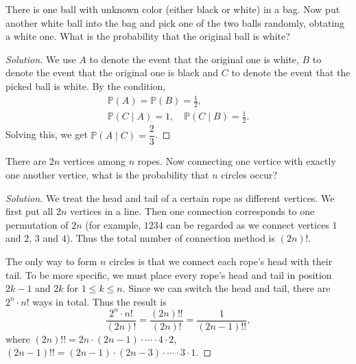 \documentclass[11pt,singlecolumn, openany, citestyle=authoryear]{elegantbook}
\begin{document}
\begin{CJK}{UTF8}{gbsn}
\begin{exercise}
    There is one ball with unknown color (either black or white) in a bag. 
    Now put another white ball into the bag and pick one of the two balls randomly,
    obtating a white one. What is the probability that the original ball is white? 
\end{exercise}
\begin{proof}[Solution]
    We use $A$ to denote the event that the original one is white, $B$ to denote the 
    event that the original one is black and $C$ to denote the event that the picked 
    ball is white. By the condition,
    \begin{gather*}
        \mathbb{P}(A) = \mathbb{P}(B) = \frac{1}{2},\\
        \mathbb{P}(C\mid A) = 1, \quad 
        \mathbb{P}(C \mid B) = \frac{1}{2}.
    \end{gather*} 
    Solving this, we get $\mathbb{P}(A\mid C)=\dfrac{2}{3}$.
\end{proof}

\begin{exercise}
    There are $2n$ vertices among $n$ ropes. Now connecting one vertice with exactly one 
    another vertice, what is the probability that $n$ circles occur? 
\end{exercise}
\begin{proof}[Solution]
    We treat the head and tail of a certain rope as different vertices.
    We first put all $2n$ vertices in a line. Then one connection corresponds
    to one permutation of $2n$ (for example, $1234$ can be regarded as 
    we connect vertices $1$ and $2$, $3$ and $4$). Thus the total number of 
    connection method is $(2n)!$.

    The only way to form $n$ circles is that we connect each rope's head with their tail.
    To be more specific, we must place every rope's head and tail in position $2k-1$ and 
    $2k$ for $1 \leqslant k \leqslant n$. Since we can switch the 
    head and tail, there are $2^n\cdot n!$ ways in total.  
    Thus the result is 
    $$
    \frac{2^n \cdot n!}{(2n)!} = \frac{(2n)!!}{(2n)!}=\frac{1}{(2n-1)!!},
    $$
    where $(2n)!!=2n\cdot(2n-1)\cdot \cdots \cdot 4 \cdot2$, 
    $(2n-1)!!=(2n-1)\cdot(2n-3)\cdot \cdots \cdot 3 \cdot1$.
\end{proof}


\end{CJK}
\end{document}

